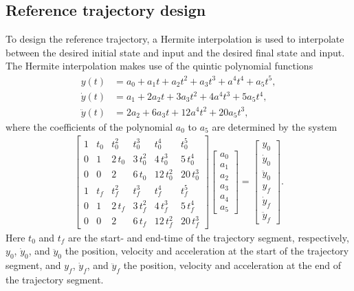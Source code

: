 \documentclass[../DC2019003Bouma.tex]{subfiles}
\begin{document}
\subsection{Reference trajectory design}
To design the reference trajectory, a Hermite interpolation is used to interpolate between the desired initial state and input and the desired final state and input. The Hermite interpolation makes use of the quintic polynomial functions
\begin{align}
y(t) &=  a_0 + a_1t + a_2t^2 + a_3t^3 + a^4t^4 + a_5t^5,\\
\dot{y}(t) &= a_1 + 2a_2t + 3a_3t^2 + 4a^4t^3 + 5a_5t^4,\\
\ddot{y}(t) &= 2a_2 + 6a_3t + 12a^4t^2 + 20a_5t^3,
\end{align}
where the coefficients of the polynomial $a_0$ to $a_5$ are determined by the system
\begin{align}
\begin{bmatrix} 1 & t_{0} & t_0^2 & t_0^3 & t_0^4 & t_0^5\\
 0 & 1 & 2\,t_{0} & 3\,t_0^2 & 4\,t_0^3 & 5\,t_0^4\\
 0 & 0 & 2 & 6\,t_{0} & 12\,t_0^2 & 20\,t_0^3\\
 1 & t_f & t_f^2 & t_f^3 & t_f^4 & t_f^5\\
 0 & 1 & 2\,t_f & 3\,t_f^2 & 4\,t_f^3 & 5\,t_f^4\\
 0 & 0 & 2 & 6\,t_f & 12\,t_f^2 & 20\,t_f^3 \end{bmatrix}\begin{bmatrix}
a_0\\a_1\\a_2\\a_3\\a_4\\a_5
\end{bmatrix}
= \begin{bmatrix}
y_0\\ \dot{y}_0\\ \ddot{y}_0\\y_f\\ \dot{y}_f\\ \ddot{y}_f
\end{bmatrix}.\label{eq:5hermite}
\end{align}
Here $t_0$ and $t_f$ are the start- and end-time of the trajectory segment, respectively, $y_0$, $\dot{y}_0$, and $\ddot{y}_0$ the position, velocity and acceleration at the start of the trajectory segment, and $y_f$, $\dot{y}_f$, and $\ddot{y}_f$ the position, velocity and acceleration at the end of the trajectory segment.
\end{document}
